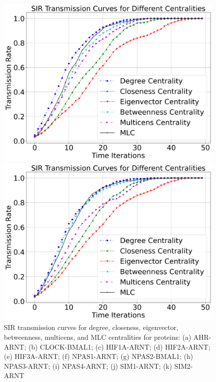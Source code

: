 \documentclass[10pt,letterpaper]{article}
\begin{document}
\begin{figure}[h!]
\begin{minipage}[b]{0.25\linewidth}
	\centering
	\includegraphics[width=\textwidth]{figs/fig26-sim1_arnt-k2top2.png}
	\subcaption{}
\end{minipage}
\hspace{0.5cm}
\begin{minipage}[b]{0.25\linewidth}
	\centering
	\includegraphics[width=\textwidth]{figs/fig27-sim2_arnt-k2top2.png}
	\subcaption{}
\end{minipage}

\caption{SIR transmission curves for degree, closeness, eigenvector, betweenness, multicens, and MLC centralities for proteins: (a) AHR-ARNT; (b) CLOCK-BMAL1; (c) HIF1A-ARNT; (d) HIF2A-ARNT; (e) HIF3A-ARNT; (f) NPAS1-ARNT; (g) NPAS2-BMAL1; (h) NPAS3-ARNT; (i) NPAS4-ARNT; (j) SIM1-ARNT; (k) SIM2-ARNT \label{fig:sir}}
\end{figure}
\end{document}
